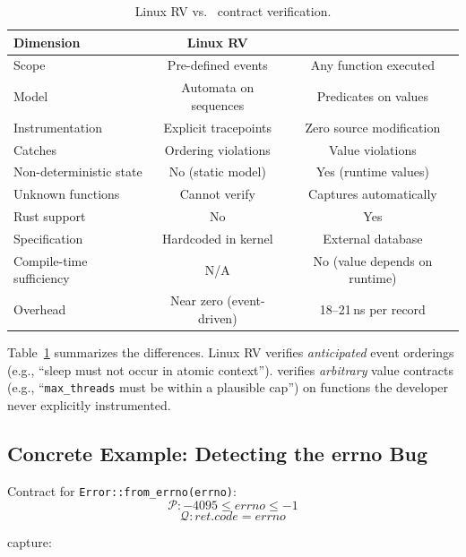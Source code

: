 \documentclass{article}
\begin{document}
\begin{table}[t]
\centering
\caption{Linux RV vs.\ \toolname{} contract verification.}\label{tab:rv}
\small
\begin{tabular}{@{}lcc@{}}
\toprule
\textbf{Dimension} & \textbf{Linux RV} & \textbf{\toolname{}} \\
\midrule
Scope & Pre-defined events & Any function executed \\
Model & Automata on sequences & Predicates on values \\
Instrumentation & Explicit tracepoints & Zero source modification \\
Catches & Ordering violations & Value violations \\
Non-deterministic state & No (static model) & Yes (runtime values) \\
Unknown functions & Cannot verify & Captures automatically \\
Rust support & No & Yes \\
Specification & Hardcoded in kernel & External database \\
Compile-time sufficiency & N/A & No (value depends on runtime) \\
Overhead & Near zero (event-driven) & 18--21\,ns per record \\
\bottomrule
\end{tabular}
\end{table}

Table~\ref{tab:rv} summarizes the differences. Linux RV verifies
\emph{anticipated} event orderings (e.g., ``sleep must not occur in atomic
context''). \toolname{} verifies \emph{arbitrary} value contracts (e.g.,
``\texttt{max\_threads} must be within a plausible cap'') on functions the
developer never explicitly instrumented.

\subsection{Concrete Example: Detecting the errno Bug}

Contract for \texttt{Error::from\_errno(errno)}:
$$\mathcal{P}: -4095 \leq \mathit{errno} \leq -1$$
$$\mathcal{Q}: \mathit{ret.code} = \mathit{errno}$$

\toolname{} capture:
\end{document}

